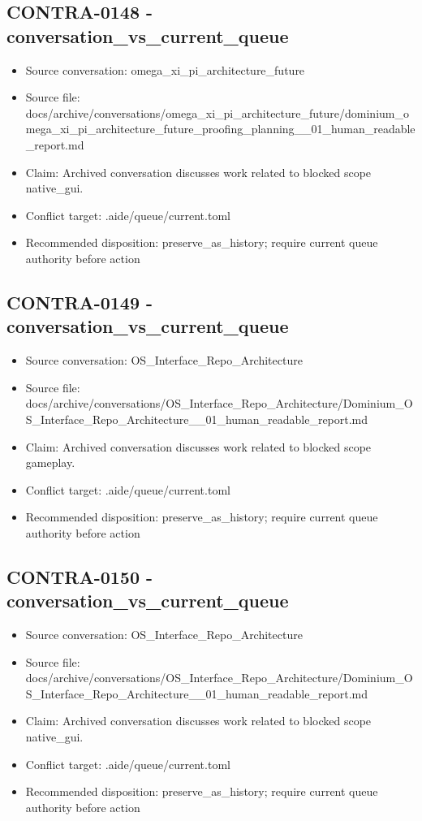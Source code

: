 \documentclass[11pt,a4paper]{report}
\begin{document}
\subsection{CONTRA-0148 - conversation\_vs\_current\_queue}

\begin{itemize}
\item Source conversation: omega\_xi\_pi\_architecture\_future
\item Source file: docs/archive/conversations/omega\_xi\_pi\_architecture\_future/dominium\_omega\_xi\_pi\_architecture\_future\_proofing\_planning\_\_01\_human\_readable\_report.md
\item Claim: Archived conversation discusses work related to blocked scope native\_gui.
\item Conflict target: .aide/queue/current.toml
\item Recommended disposition: preserve\_as\_history; require current queue authority before action
\end{itemize}

\subsection{CONTRA-0149 - conversation\_vs\_current\_queue}

\begin{itemize}
\item Source conversation: OS\_Interface\_Repo\_Architecture
\item Source file: docs/archive/conversations/OS\_Interface\_Repo\_Architecture/Dominium\_OS\_Interface\_Repo\_Architecture\_\_01\_human\_readable\_report.md
\item Claim: Archived conversation discusses work related to blocked scope gameplay.
\item Conflict target: .aide/queue/current.toml
\item Recommended disposition: preserve\_as\_history; require current queue authority before action
\end{itemize}

\subsection{CONTRA-0150 - conversation\_vs\_current\_queue}

\begin{itemize}
\item Source conversation: OS\_Interface\_Repo\_Architecture
\item Source file: docs/archive/conversations/OS\_Interface\_Repo\_Architecture/Dominium\_OS\_Interface\_Repo\_Architecture\_\_01\_human\_readable\_report.md
\item Claim: Archived conversation discusses work related to blocked scope native\_gui.
\item Conflict target: .aide/queue/current.toml
\item Recommended disposition: preserve\_as\_history; require current queue authority before action
\end{itemize}
\end{document}

